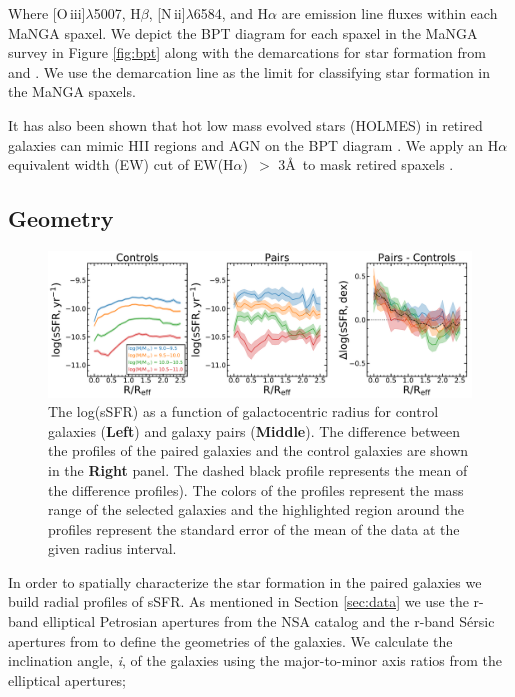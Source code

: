 \documentclass[iop,revtex4,twocolumn,apj,numberedappendix,appendixfloats]{emulateapj}
\newcommand{\OIII}{[O\,{\sc iii}]}
\newcommand{\NII}{[N\,{\sc ii}]}
\newcommand{\ewha}{EW(H$\alpha$)}
\begin{document}
Where \OIII$\lambda$5007, H$\beta$, \NII$\lambda$6584, and H$\alpha$ are emission line fluxes within each MaNGA spaxel. We depict the BPT diagram for each spaxel in the MaNGA survey in Figure \ref{fig:bpt} along with the demarcations for star formation from \citet{Kewley:2001} and \citet{Kauffmann:2003}. We use the \citet{Kewley:2001} demarcation line as the limit for classifying star formation in the MaNGA spaxels. 

It has also been shown that hot low mass evolved stars (HOLMES) in retired galaxies can mimic HII regions and AGN on the BPT diagram \citep{Stasinska:2008}. We apply an H$\alpha$ equivalent width (EW) cut of \ewha\ $>$ 3\AA\ to mask retired spaxels \citet{Cid-Fernandes:2011}. 

 

\subsection{Geometry}\label{sec:radial}

\begin{figure}
\centering
\includegraphics[width=\linewidth]{fig/ssfr_comb.pdf}
\caption[]{The log(sSFR) as a function of galactocentric radius for control galaxies (\textbf{Left}) and galaxy pairs (\textbf{Middle}). The difference between the profiles of the paired galaxies and the control galaxies are shown in the \textbf{Right} panel. The dashed black profile represents the mean of the difference profiles). The colors of the profiles represent the mass range of the selected galaxies and the highlighted region around the profiles represent the standard error of the mean of the data at the given radius interval.}
\label{fig:ssfr_prof}
\end{figure}

In order to spatially characterize the star formation in the paired galaxies we build radial profiles of sSFR. As mentioned in Section \ref{sec:data} we use the r-band elliptical Petrosian apertures from the NSA catalog and the r-band S\'ersic apertures from \citet{Simard:2011} to define the geometries of the galaxies. We calculate the inclination angle, {\it i}, of the galaxies using the major-to-minor axis ratios from the elliptical apertures;
\end{document}
